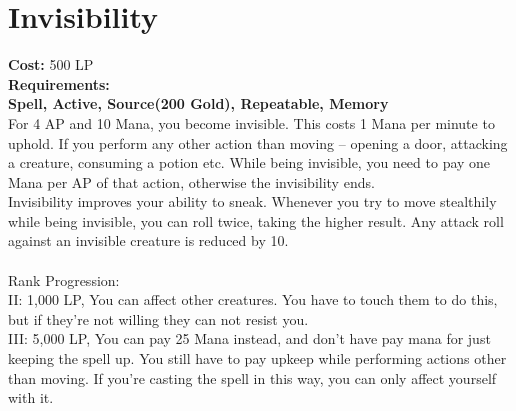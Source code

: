 \section{Invisibility}\label{spell:invisibility}
\textbf{Cost:} 500 LP\\
\textbf{Requirements:}\\
\textbf{Spell, Active, Source(200 Gold), Repeatable, Memory}\\
For 4 AP and 10 Mana, you become invisible.
This costs 1 Mana per minute to uphold.
If you perform any other action than moving -- opening a door, attacking a creature, consuming a potion etc.
While being invisible, you need to pay one Mana per AP of that action, otherwise the invisibility ends.\\
Invisibility improves your ability to sneak.
Whenever you try to move stealthily while being invisible, you can roll twice, taking the higher result.
Any attack roll against an invisible creature is reduced by 10.\\
\\
Rank Progression:\\
II: 1,000 LP, You can affect other creatures.
You have to touch them to do this, but if they're not willing they can not resist you.\\

III: 5,000 LP, You can pay 25 Mana instead, and don't have pay mana for just keeping the spell up.
You still have to pay upkeep while performing actions other than moving.
If you're casting the spell in this way, you can only affect yourself with it.\\